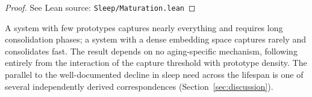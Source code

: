 \begin{proof}
\leanok
{}
See Lean source: \texttt{Sleep/Maturation.lean}
\end{proof}

\begin{remark}
\label{rem:development}
\leanok
{}
A system with few prototypes captures nearly everything and requires long consolidation phases; a system with a dense embedding space captures rarely and consolidates fast.  The result depends on no aging-specific mechanism, following entirely from the interaction of the capture threshold with prototype density.  The parallel to the well-documented decline in sleep need across the lifespan is one of several independently derived correspondences (Section~\ref{sec:discussion}).
\end{remark}

